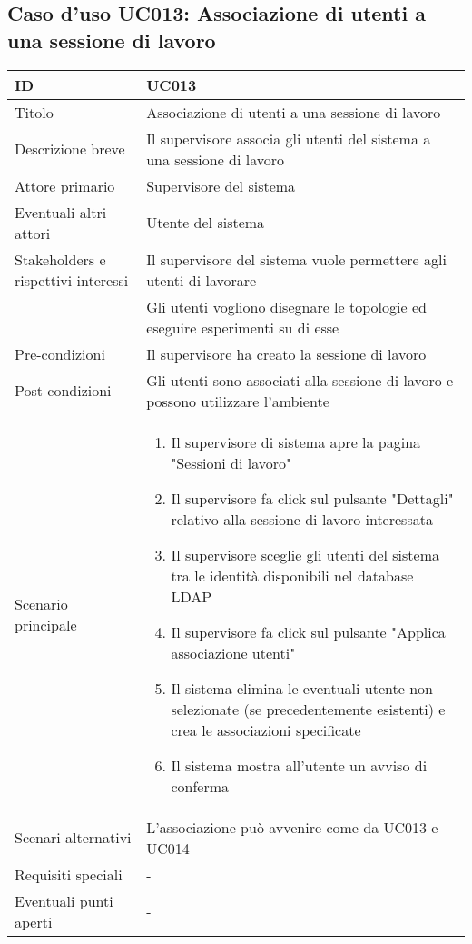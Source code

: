 \documentclass[../../main.tex]{subfiles}
\begin{document}
\subsection{Caso d’uso UC013: Associazione di utenti a una sessione di lavoro }
\begin{tabularx}{150mm}{|l|X|}
    \hline
    ID                                  & \textbf{UC013}\\
    \hline
    Titolo                              & Associazione di utenti a una sessione di lavoro \\
    \hline
    Descrizione breve                   & Il supervisore associa gli utenti del sistema a una sessione di lavoro   \\
    \hline
    Attore primario                     & Supervisore del sistema   \\
    \hline
    Eventuali altri attori              & Utente del sistema   \\
    \hline
    Stakeholders e rispettivi interessi & Il supervisore del sistema vuole permettere agli utenti di lavorare   \\ & Gli utenti vogliono disegnare le topologie ed eseguire esperimenti su di esse   \\
    \hline
    Pre-condizioni                      & Il supervisore ha creato la sessione di lavoro   \\
    \hline
    Post-condizioni                     & Gli utenti sono associati alla sessione di lavoro e possono utilizzare l'ambiente   \\
    \hline
    Scenario principale                 & 
    \begin{enumerate}
        \item Il supervisore di sistema apre la pagina "Sessioni di lavoro"
        \item Il supervisore fa click sul pulsante "Dettagli" relativo alla sessione di lavoro interessata
        \item Il supervisore sceglie gli utenti del sistema tra le identità disponibili nel database LDAP
        \item Il supervisore fa click sul pulsante "Applica associazione utenti"
        \item Il sistema elimina le eventuali utente non selezionate (se precedentemente esistenti) e crea le associazioni specificate
        \item Il sistema mostra all'utente un avviso di conferma
    \end{enumerate}
    \\
    \hline
    Scenari alternativi                 &    L'associazione può avvenire come da UC013 e UC014\\
    \hline
    Requisiti speciali                  &    -\\
    \hline
    Eventuali punti aperti              &    -\\
    \hline
\end{tabularx}
\vfill\newpage
\end{document}
